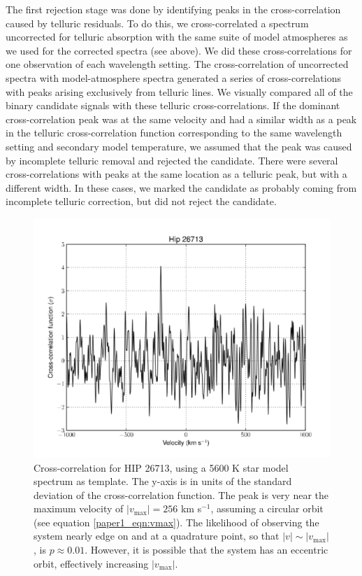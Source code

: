 The first rejection stage was done by identifying peaks in the
cross-correlation caused by telluric residuals. To do this, we
cross-correlated a spectrum uncorrected for telluric absorption with
the same suite of model atmospheres as we used for the corrected
spectra (see above). We did these cross-correlations for one observation of each wavelength
setting. The cross-correlation of uncorrected spectra with model-atmosphere spectra generated a series of cross-correlations with peaks
arising exclusively from telluric lines. We visually compared all
of the binary candidate signals with these telluric
cross-correlations. If the dominant cross-correlation peak was at the
same velocity and had a similar width as a peak in the telluric
cross-correlation function corresponding to the same wavelength
setting and secondary model temperature, we assumed that the peak was caused by incomplete
telluric removal and rejected the candidate. There were several
cross-correlations with peaks at the same location as a telluric peak,
but with a different width. In these cases, we marked the candidate as
probably coming from incomplete telluric correction, but did not
reject the candidate.



\begin{figure}[t]
  \centering
  \includegraphics[width=\columnwidth]{Figures/paper1_fig4.pdf}
  \caption{Cross-correlation for HIP 26713, using a 5600 K star model spectrum as template. The y-axis is in units of
    the standard deviation of the cross-correlation function. The peak is very near the maximum velocity of $|v_\mathrm{max}| = 256$ km s$^{-1}$, assuming a circular orbit (see equation \ref{paper1_eqn:vmax}). The likelihood of observing the system nearly edge on and at a quadrature point, so that $|v| \sim |v_\mathrm{max}|$, is $p \approx 0.01$. However, it is possible that the system has an eccentric orbit, effectively increasing $|v_\mathrm{max}|$.}
  \label{paper1_fig:hip26713}
\end{figure}

